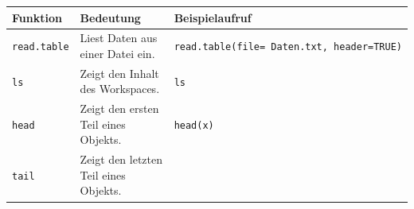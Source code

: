 \documentclass[]{book}
\begin{document}
\begin{longtable}[]{@{}lll@{}}
\toprule
\begin{minipage}[b]{0.30\columnwidth}\raggedright
Funktion\strut
\end{minipage} & \begin{minipage}[b]{0.28\columnwidth}\raggedright
Bedeutung\strut
\end{minipage} & \begin{minipage}[b]{0.33\columnwidth}\raggedright
Beispielaufruf\strut
\end{minipage}\tabularnewline
\midrule
\endhead
\begin{minipage}[t]{0.30\columnwidth}\raggedright
\texttt{read.table}\strut
\end{minipage} & \begin{minipage}[t]{0.28\columnwidth}\raggedright
Liest Daten aus einer Datei ein.\strut
\end{minipage} & \begin{minipage}[t]{0.33\columnwidth}\raggedright
\texttt{read.table(file=\ \textquotesingle{}Daten.txt\textquotesingle{},\ header=TRUE)}\strut
\end{minipage}\tabularnewline
\begin{minipage}[t]{0.30\columnwidth}\raggedright
\texttt{ls}\strut
\end{minipage} & \begin{minipage}[t]{0.28\columnwidth}\raggedright
Zeigt den Inhalt des Workspaces.\strut
\end{minipage} & \begin{minipage}[t]{0.33\columnwidth}\raggedright
\texttt{ls}\strut
\end{minipage}\tabularnewline
\begin{minipage}[t]{0.30\columnwidth}\raggedright
\texttt{head}\strut
\end{minipage} & \begin{minipage}[t]{0.28\columnwidth}\raggedright
Zeigt den ersten Teil eines Objekts.\strut
\end{minipage} & \begin{minipage}[t]{0.33\columnwidth}\raggedright
\texttt{head(x)}\strut
\end{minipage}\tabularnewline
\begin{minipage}[t]{0.30\columnwidth}\raggedright
\texttt{tail}\strut
\end{minipage} & \begin{minipage}[t]{0.28\columnwidth}\raggedright
Zeigt den letzten Teil eines Objekts.\strut
\end{minipage} & \begin{minipage}[t]{0.33\columnwidth}\raggedright

\end{minipage}
\end{longtable}
\end{document}
